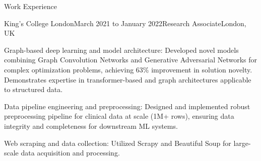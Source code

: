 \documentclass{resume} %
\begin{document}
\begin{rSection}{Work Experience}
\begin{rSubsection}{King's College London}{March 2021 to January 2022}{Research Associate}{London, UK}
\item Graph-based deep learning and model architecture: Developed novel models combining Graph Convolution Networks and Generative Adversarial Networks for complex optimization problems, achieving 63\% improvement in solution novelty. Demonstrates expertise in transformer-based and graph architectures applicable to structured data.
\item Data pipeline engineering and preprocessing: Designed and implemented robust preprocessing pipeline for clinical data at scale (1M+ rows), ensuring data integrity and completeness for downstream ML systems.
\item Web scraping and data collection: Utilized Scrapy and Beautiful Soup for large-scale data acquisition and processing.

\end{rSubsection}

\end{rSection}

\end{document}
